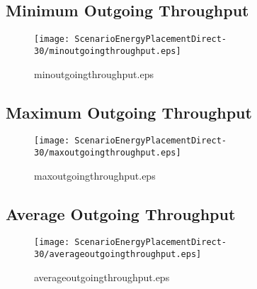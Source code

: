 \documentclass{elsart}
\begin{document}
\clearpage
\subsection{Minimum Outgoing Throughput}

\begin{figure}[ht]
\centering
\texttt{[image: ScenarioEnergyPlacementDirect-30/minoutgoingthroughput.eps]}
\caption{minoutgoingthroughput.eps}\label{fig:minoutgoingthroughput}
\end{figure}

\clearpage
\subsection{Maximum Outgoing Throughput}

\begin{figure}[ht]
\centering
\texttt{[image: ScenarioEnergyPlacementDirect-30/maxoutgoingthroughput.eps]}
\caption{maxoutgoingthroughput.eps}\label{fig:maxoutgoingthroughput}
\end{figure}

\clearpage
\subsection{Average Outgoing Throughput}

\begin{figure}[ht]
\centering
\texttt{[image: ScenarioEnergyPlacementDirect-30/averageoutgoingthroughput.eps]}
\caption{averageoutgoingthroughput.eps}\label{fig:averageoutgoingthroughput}
\end{figure}

\clearpage
\end{document}

